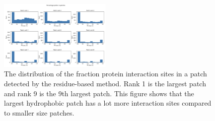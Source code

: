 \documentclass[11pt,a4paper]{article}
\begin{document}
\begin{figure}[h!]
  \centering
  \includegraphics[width=0.48\textwidth]{figures/s2.png}
  \caption{ The distribution of the fraction protein interaction sites in a patch detected by the residue-based method. Rank 1 is the largest patch and rank 9 is the 9th largest patch. This figure shows that the largest hydrophobic patch has a lot more interaction sites compared to smaller size patches.}
  \label{s2}
\end{figure}




\end{document}
